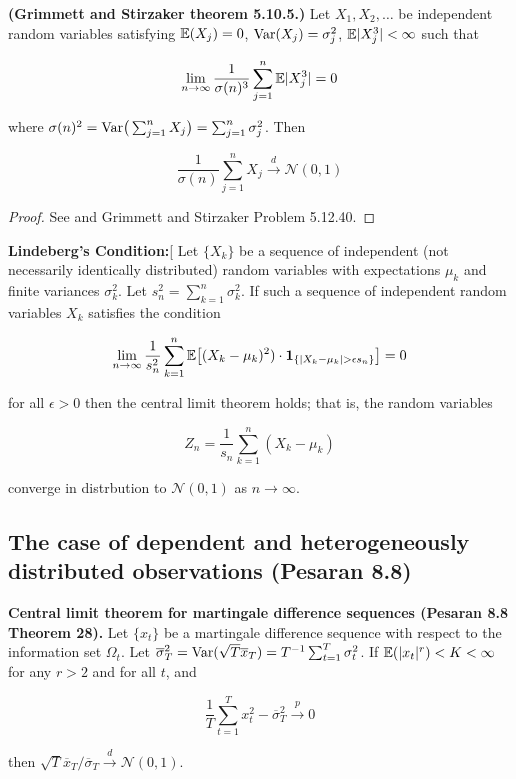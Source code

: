 \begin{theorem}\textbf{(Grimmett and Stirzaker theorem 5.10.5.)} Let \(X_1, X_2, \ldots\) be independent random variables satisfying \(\mathbb{E}(X_j) = 0\), \(\mathrm{Var}(X_j) = \sigma_j^2\), \(\mathbb{E}|X_j^3| < \infty\) such that

\[
\lim_{n \to \infty} \frac{1}{\sigma(n)^3} \sum_{j=1}^n \mathbb{E}|X_j^3| = 0
\]

where \(\sigma(n)^2 = \mathrm{Var}\big( \sum_{j=1}^n X_j \big) = \sum_{j=1}^n \sigma_j^2\). Then 

\[
\frac{1}{\sigma(n)} \sum_{j=1}^n X_j \xrightarrow{d} \mathcal{N}(0,1)
\]
\end{theorem}
\begin{proof}See \citet[p. 287]{loeve1977probability} and Grimmett and Stirzaker Problem 5.12.40.\end{proof}

\begin{lemma}\textbf{Lindeberg's Condition:}[\label{asym.lindeberg.cond} Let \(\{X_k\}\) be a sequence of independent (not necessarily identically distributed) random variables with expectations \(\mu_k\) and finite variances \(\sigma_k^2\). Let \(s_n^2 = \sum_{k=1}^n \sigma_k^2\). If such a sequence of independent random variables \(X_k\) satisfies the condition

\[
\lim_{n \to \infty} \frac{1}{s_n^2} \sum_{k=1}^n \mathbb{E} \big[(X_k - \mu_k)^2) \cdot \boldsymbol{1}_{\{|X_k - \mu_k| > \epsilon s_n\}} \big] = 0
\]

for all \(\epsilon > 0\) then the central limit theorem holds; that is, the random variables

\[
Z_n = \frac{1}{s_n} \sum_{k=1}^n(X_k - \mu_k)
\]

converge in distrbution to \(\mathcal{N}(0, 1)\) as \(n \to \infty\).
\end{lemma}

\subsection{The case of dependent and heterogeneously distributed observations (Pesaran 8.8)}


\begin{theorem}\label{asym.clt.mart.ds} \textbf{Central limit theorem for martingale difference sequences (Pesaran 8.8 Theorem 28).} Let \(\{x_t\}\) be a martingale difference sequence with respect to the information set \(\Omega_t\). Let \(\overline{\sigma}_T^2 = \mathrm{Var}( \sqrt{T} \overline{x}_T) = T^{-1} \sum_{t=1}^T \sigma_t^2\). If \(\mathbb{E}(|x_t|^r) < K < \infty\) for any \(r > 2\) and for all \(t\), and

\[
\frac{1}{T} \sum_{t=1}^T x_t^2 - \overline{\sigma}_T^2 \xrightarrow{p} 0
\]

then \(\sqrt{T} \overline{x}_T / \overline{\sigma}_T \xrightarrow{d} \mathcal{N}(0, 1)\).
\end{theorem}


